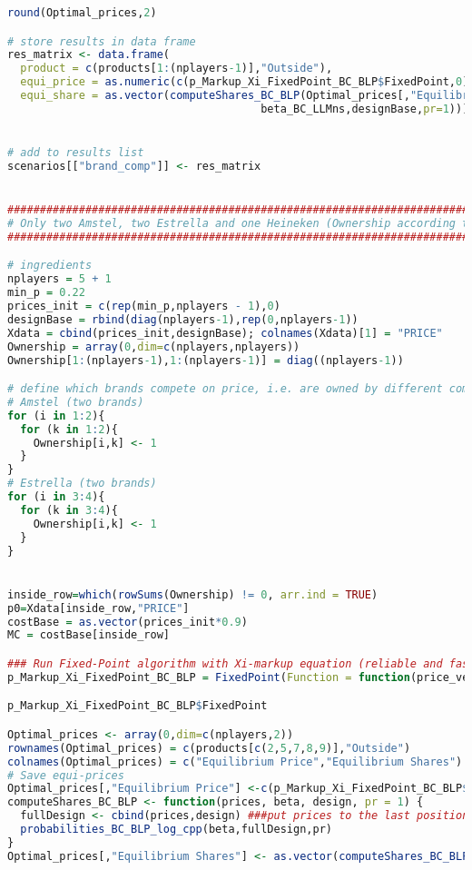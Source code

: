 \begin{lstlisting}[language=R,caption={Computing dynamic Nash equilibria in different competitive scenarios via the fixed point algorithm}, label=lst_nash_esti]
round(Optimal_prices,2)

# store results in data frame
res_matrix <- data.frame(
  product = c(products[1:(nplayers-1)],"Outside"),
  equi_price = as.numeric(c(p_Markup_Xi_FixedPoint_BC_BLP$FixedPoint,0)),
  equi_share = as.vector(computeShares_BC_BLP(Optimal_prices[,"Equilibrium Price"],
                                       beta_BC_LLMns,designBase,pr=1)))


# add to results list
scenarios[["brand_comp"]] <- res_matrix


###########################################################################
# Only two Amstel, two Estrella and one Heineken (Ownership according to brands)
###########################################################################

# ingredients
nplayers = 5 + 1 
min_p = 0.22
prices_init = c(rep(min_p,nplayers - 1),0)
designBase = rbind(diag(nplayers-1),rep(0,nplayers-1))
Xdata = cbind(prices_init,designBase); colnames(Xdata)[1] = "PRICE" 
Ownership = array(0,dim=c(nplayers,nplayers))
Ownership[1:(nplayers-1),1:(nplayers-1)] = diag((nplayers-1))

# define which brands compete on price, i.e. are owned by different companies
# Amstel (two brands)
for (i in 1:2){
  for (k in 1:2){
    Ownership[i,k] <- 1
  }
}
# Estrella (two brands)
for (i in 3:4){
  for (k in 3:4){
    Ownership[i,k] <- 1
  }
}


inside_row=which(rowSums(Ownership) != 0, arr.ind = TRUE)
p0=Xdata[inside_row,"PRICE"]
costBase = as.vector(prices_init*0.9)
MC = costBase[inside_row]

### Run Fixed-Point algorithm with Xi-markup equation (reliable and fast: See Table 3 in paper for comparison)
p_Markup_Xi_FixedPoint_BC_BLP = FixedPoint(Function = function(price_vec) FixedPoint_BLP_Xi(price_vec,MC=MC, ownership=Ownership,Xdata=Xdata,beta_draws=beta_BC_LLMns[,(c(1,2,4,7,9,10,11))],pr=1), Inputs = p0, MaxIter = 10000, ConvergenceMetricThreshold = 1e-10, Method = "Anderson")

p_Markup_Xi_FixedPoint_BC_BLP$FixedPoint

Optimal_prices <- array(0,dim=c(nplayers,2))
rownames(Optimal_prices) = c(products[c(2,5,7,8,9)],"Outside")
colnames(Optimal_prices) = c("Equilibrium Price","Equilibrium Shares")
# Save equi-prices
Optimal_prices[,"Equilibrium Price"] <-c(p_Markup_Xi_FixedPoint_BC_BLP$FixedPoint,0)
computeShares_BC_BLP <- function(prices, beta, design, pr = 1) {
  fullDesign <- cbind(prices,design) ###put prices to the last position here
  probabilities_BC_BLP_log_cpp(beta,fullDesign,pr)
}
Optimal_prices[,"Equilibrium Shares"] <- as.vector(computeShares_BC_BLP(Optimal_prices[,"Equilibrium Price"], beta_BC_LLMns[,c(1,2,4,7,9,10,11)],designBase,pr=1))


\end{lstlisting}
